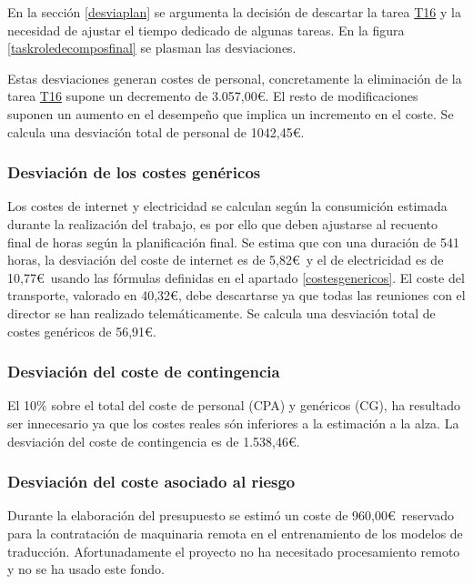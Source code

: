 En la sección \ref{desviaplan} se argumenta la decisión de descartar la tarea \hyperref[T16]{T16} y la necesidad de ajustar el tiempo dedicado de algunas tareas. En la figura \ref{taskroledecomposfinal} se plasman las desviaciones.

Estas desviaciones generan costes de personal, concretamente la eliminación de la tarea \hyperref[T16]{T16} supone un decremento de 3.057,00\euro. El resto de modificaciones suponen un aumento en el desempeño que implica un incremento en el coste.
Se calcula una desviación total de personal de 1042,45\euro.
\subsubsection{Desviación de los costes genéricos}
Los costes de internet y electricidad se calculan según la consumición estimada durante la realización del trabajo, es por ello que
deben ajustarse al recuento final de horas según la planificación final. Se estima que con una duración de 541 horas, la desviación del coste
de internet es de 5,82\euro\ y el de electricidad es de 10,77\euro\ usando las fórmulas definidas en el apartado \ref{costesgenericos}.
El coste del transporte, valorado en 40,32\euro, debe descartarse ya que todas las reuniones con el director se han realizado telemáticamente.
Se calcula una desviación total de costes genéricos de 56,91\euro.
\subsubsection{Desviación del coste de contingencia}
El 10\% sobre el total del coste de personal (CPA) y genéricos (CG), ha resultado ser innecesario ya que los costes reales són inferiores a la estimación a la alza. La desviación del coste de contingencia es de 1.538,46\euro.
\subsubsection{Desviación del coste asociado al riesgo}
Durante la elaboración del presupuesto se estimó un coste de 960,00\euro\ reservado para la contratación de maquinaria remota en el entrenamiento de los modelos de traducción. Afortunadamente el proyecto no ha necesitado procesamiento remoto y no se ha usado este fondo.


